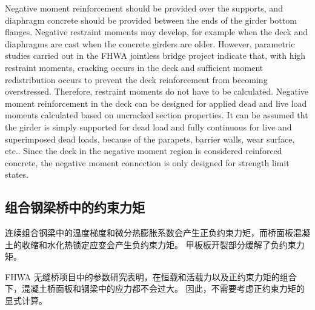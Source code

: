 Negative moment reinforcement should be provided over the supports, and diaphragm concrete should be provided between the ends of the girder bottom flanges. Negative restraint moments may develop, for example when the deck and diaphragms are cast when the concrete girders are older. However, parametric studies carried out in the FHWA jointless bridge project indicate that, with high restraint moments, cracking occurs in the deck and sufficient moment redistribution occurs to prevent the deck reinforcement from becoming overstressed. Therefore, restraint moments do not have to be calculated. Negative moment reinforcement in the deck can be designed for applied dead and live load moments calculated based on uncracked section properties. It can be assumed tht the girder is simply supported for dead load and fully continuous for live and superimposed dead loads, because of the parapets, barrier walls, wear surface, etc.. Since the deck in the negative moment region is considered reinforced concrete, the negative moment connection is only designed for strength limit states.


\subsection{组合钢梁桥中的约束力矩}
连续组合钢梁中的温度梯度和微分热膨胀系数会产生正负约束力矩，而桥面板混凝土的收缩和水化热锁定应变会产生负约束力矩。 甲板板开裂部分缓解了负约束力矩。

FHWA 无缝桥项目中的参数研究表明，在恒载和活载力以及正约束力矩的组合下，混凝土桥面板和钢梁中的应力都不会过大。 因此，不需要考虑正约束力矩的显式计算。

